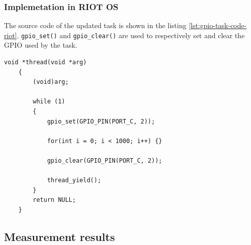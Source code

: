 \subsubsection{Implemetation in RIOT OS}
The source code of the updated task is shown in the listing \ref{lst:gpio-task-code-riot}.
\texttt{gpio\_set()} and \texttt{gpio\_clear()} are used to respectively set and clear the GPIO used by the task.

\begin{lstlisting}[style=CStyle, float, label={lst:gpio-task-code-riot}, caption={Source code of a task implemented in RIOT OS for the simple application}]
    void *thread(void *arg)
    {
        (void)arg;
    
        while (1)
        {
            gpio_set(GPIO_PIN(PORT_C, 2));

            for(int i = 0; i < 1000; i++) {}

            gpio_clear(GPIO_PIN(PORT_C, 2));

            thread_yield();
        }
        return NULL;
    }
    \end{lstlisting}

\subsection{Measurement results}





